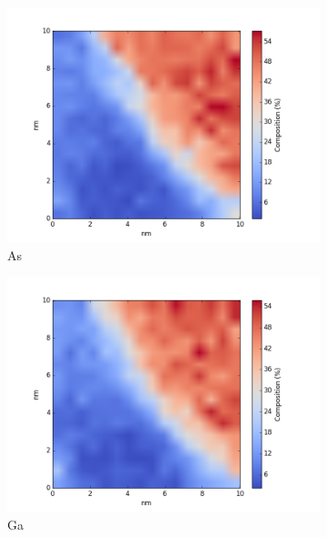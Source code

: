 \begin{figure}
	\centering
	\begin{subfigure}{0.5\linewidth}
		\includegraphics[width=\linewidth]{fig/q/D_heatedGeKline/As_zetaAbs}
		\caption{As}
		\label{fig:Das}
	\end{subfigure}%
	\hfill
	\begin{subfigure}{0.5\linewidth}
		\includegraphics[width=\linewidth]{fig/q/D_heatedGeKline/Ga_zetaAbs}
		\caption{Ga}
		\label{fig:Dga}
	\end{subfigure}
	\centering
	\begin{subfigure}{0.5\textwidth}

\end{subfigure}
\end{figure}
